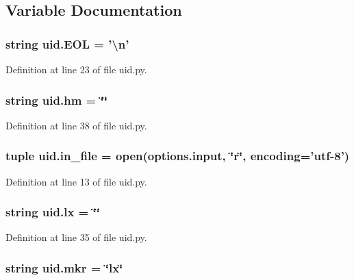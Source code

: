 \subsection{Variable Documentation}
\hypertarget{namespaceuid_af23356e75a458bc84f8a06c4c25666d7}{
\subsubsection[{E\+O\+L}]{\setlength{\rightskip}{0pt plus 5cm}string uid.\+E\+O\+L = '\textbackslash{}n'}}\label{namespaceuid_af23356e75a458bc84f8a06c4c25666d7}


Definition at line 23 of file uid.\+py.

\hypertarget{namespaceuid_ade7b1be6934c8984615916e73a81d131}{
\subsubsection[{hm}]{\setlength{\rightskip}{0pt plus 5cm}string uid.\+hm = \char`\"{}\char`\"{}}}\label{namespaceuid_ade7b1be6934c8984615916e73a81d131}


Definition at line 38 of file uid.\+py.

\hypertarget{namespaceuid_ad8ae4f6e71a89183bdd76ea3bb1d4b77}{
\subsubsection[{in\+\_\+file}]{\setlength{\rightskip}{0pt plus 5cm}tuple uid.\+in\+\_\+file = open(options.\+input, \char`\"{}r\char`\"{}, encoding='utf-\/8')}}\label{namespaceuid_ad8ae4f6e71a89183bdd76ea3bb1d4b77}


Definition at line 13 of file uid.\+py.

\hypertarget{namespaceuid_aa8bd0ffc225dc8124099330d1014bf66}{
\subsubsection[{lx}]{\setlength{\rightskip}{0pt plus 5cm}string uid.\+lx = \char`\"{}\char`\"{}}}\label{namespaceuid_aa8bd0ffc225dc8124099330d1014bf66}


Definition at line 35 of file uid.\+py.

\hypertarget{namespaceuid_a542decb494fb3ac0da8886ab033622ad}{
\subsubsection[{mkr}]{\setlength{\rightskip}{0pt plus 5cm}string uid.\+mkr = \char`\"{}lx\char`\"{}}}\label{namespaceuid_a542decb494fb3ac0da8886ab033622ad}


